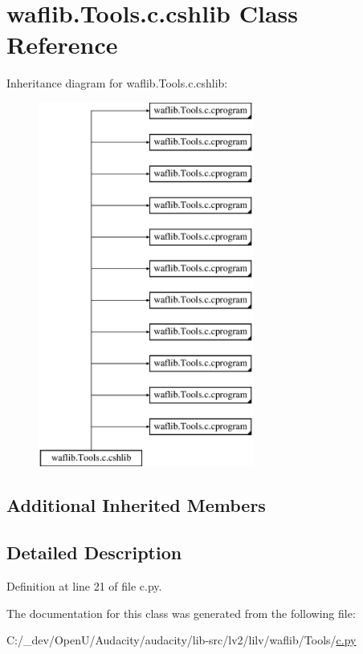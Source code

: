 \hypertarget{classwaflib_1_1_tools_1_1c_1_1cshlib}{}\section{waflib.\+Tools.\+c.\+cshlib Class Reference}
\label{classwaflib_1_1_tools_1_1c_1_1cshlib}
Inheritance diagram for waflib.\+Tools.\+c.\+cshlib\+:\begin{figure}[H]
\begin{center}
\leavevmode
\includegraphics[height=12.000000cm]{classwaflib_1_1_tools_1_1c_1_1cshlib}
\end{center}
\end{figure}
\subsection*{Additional Inherited Members}


\subsection{Detailed Description}


Definition at line 21 of file c.\+py.



The documentation for this class was generated from the following file\+:\begin{DoxyCompactItemize}
\item 
C\+:/\+\_\+dev/\+Open\+U/\+Audacity/audacity/lib-\/src/lv2/lilv/waflib/\+Tools/\hyperlink{lilv_2waflib_2_tools_2c_8py}{c.\+py}\end{DoxyCompactItemize}
